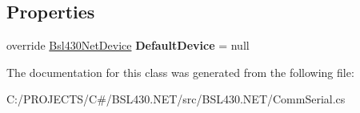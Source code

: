\subsection*{Properties}
\begin{DoxyCompactItemize}
\item 
\mbox{\label{class_b_s_l430___n_e_t_1_1_comm_1_1_comm_serial_af0948d49517c28d106707c7fe48b8547}} 
override \mbox{\hyperlink{class_b_s_l430___n_e_t_1_1_bsl430_net_device}{Bsl430\+Net\+Device}} {\bfseries Default\+Device} = null
\end{DoxyCompactItemize}


The documentation for this class was generated from the following file\+:\begin{DoxyCompactItemize}
\item 
C\+:/\+P\+R\+O\+J\+E\+C\+T\+S/\+C\#/\+B\+S\+L430.\+N\+E\+T/src/\+B\+S\+L430.\+N\+E\+T/Comm\+Serial.\+cs\end{DoxyCompactItemize}
